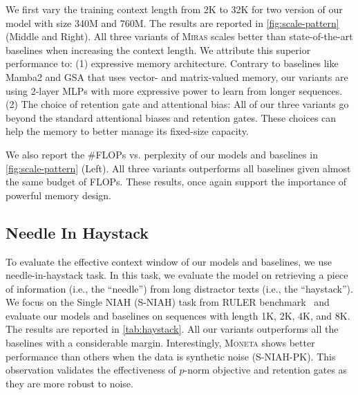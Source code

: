 \documentclass{article}
\newcommand{\citep}{\parencite}
\newcommand{\framework}[0]{\textsc{Miras}}
\newcommand{\mmodel}[0]{\textsc{Moneta}}
\theoremstyle{plain}
\theoremstyle{definition}
\theoremstyle{remark}
\newcommand{\head}[1]{\vspace{1.7mm}\noindent{{\textcolor{c2}{\bf #1.}}}}
\begin{document}
\head{Context Length}
We first vary the training context length from 2K to 32K for two version of our model with size 340M and 760M. The results are reported in \autoref{fig:scale-pattern} (Middle and Right). All three variants of \framework{} scales better than state-of-the-art baselines when increasing the context length. We attribute this superior performance to: (1) expressive memory architecture. Contrary to baselines like Mamba2 and GSA that uses vector- and matrix-valued memory, our variants are using 2-layer MLPs with more expressive power to learn from longer sequences. (2) The choice of retention gate and attentional bias: All of our three variants go beyond the standard attentional biases and retention gates. These choices can help the memory to better manage its fixed-size capacity.

\head{Model Size}
We also report the \#FLOPs vs. perplexity of our models and baselines in \autoref{fig:scale-pattern} (Left). All three variants outperforms all baselines given almost the same budget of FLOPs. These results, once again support the importance of powerful memory design.

\subsection{Needle In Haystack}
To evaluate the effective context window of our models and baselines, we use needle-in-haystack task. In this task, we evaluate the model on retrieving a piece of information (i.e., the ``needle'') from long distractor texts (i.e., the ``haystack''). We focus on the Single NIAH (S-NIAH) task from RULER benchmark~\citep{hsieh2024ruler} and evaluate our models and baselines on sequences with length 1K, 2K, 4K, and 8K. The results are reported in \autoref{tab:haystack}. All our variants outperforms all the baselines with a considerable margin. Interestingly, \mmodel{} shows better performance than others when the data is synthetic noise (S-NIAH-PK). This observation validates the effectiveness of $p$-norm objective and retention gates as they are more robust to noise.  
\end{document}
